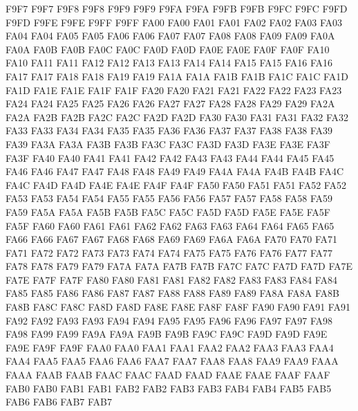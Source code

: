 \ID F9F7 F9F7
\ID F9F8 F9F8
\ID F9F9 F9F9
\ID F9FA F9FA
\ID F9FB F9FB
\ID F9FC F9FC
\ID F9FD F9FD
\ID F9FE F9FE
\ID F9FF F9FF
\ID FA00 FA00
\ID FA01 FA01
\ID FA02 FA02
\ID FA03 FA03
\ID FA04 FA04
\ID FA05 FA05
\ID FA06 FA06
\ID FA07 FA07
\ID FA08 FA08
\ID FA09 FA09
\ID FA0A FA0A
\ID FA0B FA0B
\ID FA0C FA0C
\ID FA0D FA0D
\ID FA0E FA0E
\ID FA0F FA0F
\ID FA10 FA10
\ID FA11 FA11
\ID FA12 FA12
\ID FA13 FA13
\ID FA14 FA14
\ID FA15 FA15
\ID FA16 FA16
\ID FA17 FA17
\ID FA18 FA18
\ID FA19 FA19
\ID FA1A FA1A
\ID FA1B FA1B
\ID FA1C FA1C
\ID FA1D FA1D
\ID FA1E FA1E
\ID FA1F FA1F
\ID FA20 FA20
\ID FA21 FA21
\ID FA22 FA22
\ID FA23 FA23
\ID FA24 FA24
\ID FA25 FA25
\ID FA26 FA26
\ID FA27 FA27
\ID FA28 FA28
\ID FA29 FA29
\ID FA2A FA2A
\ID FA2B FA2B
\ID FA2C FA2C
\ID FA2D FA2D
\ID FA30 FA30
\ID FA31 FA31
\ID FA32 FA32
\ID FA33 FA33
\ID FA34 FA34
\ID FA35 FA35
\ID FA36 FA36
\ID FA37 FA37
\ID FA38 FA38
\ID FA39 FA39
\ID FA3A FA3A
\ID FA3B FA3B
\ID FA3C FA3C
\ID FA3D FA3D
\ID FA3E FA3E
\ID FA3F FA3F
\ID FA40 FA40
\ID FA41 FA41
\ID FA42 FA42
\ID FA43 FA43
\ID FA44 FA44
\ID FA45 FA45
\ID FA46 FA46
\ID FA47 FA47
\ID FA48 FA48
\ID FA49 FA49
\ID FA4A FA4A
\ID FA4B FA4B
\ID FA4C FA4C
\ID FA4D FA4D
\ID FA4E FA4E
\ID FA4F FA4F
\ID FA50 FA50
\ID FA51 FA51
\ID FA52 FA52
\ID FA53 FA53
\ID FA54 FA54
\ID FA55 FA55
\ID FA56 FA56
\ID FA57 FA57
\ID FA58 FA58
\ID FA59 FA59
\ID FA5A FA5A
\ID FA5B FA5B
\ID FA5C FA5C
\ID FA5D FA5D
\ID FA5E FA5E
\ID FA5F FA5F
\ID FA60 FA60
\ID FA61 FA61
\ID FA62 FA62
\ID FA63 FA63
\ID FA64 FA64
\ID FA65 FA65
\ID FA66 FA66
\ID FA67 FA67
\ID FA68 FA68
\ID FA69 FA69
\ID FA6A FA6A
\ID FA70 FA70
\ID FA71 FA71
\ID FA72 FA72
\ID FA73 FA73
\ID FA74 FA74
\ID FA75 FA75
\ID FA76 FA76
\ID FA77 FA77
\ID FA78 FA78
\ID FA79 FA79
\ID FA7A FA7A
\ID FA7B FA7B
\ID FA7C FA7C
\ID FA7D FA7D
\ID FA7E FA7E
\ID FA7F FA7F
\ID FA80 FA80
\ID FA81 FA81
\ID FA82 FA82
\ID FA83 FA83
\ID FA84 FA84
\ID FA85 FA85
\ID FA86 FA86
\ID FA87 FA87
\ID FA88 FA88
\ID FA89 FA89
\ID FA8A FA8A
\ID FA8B FA8B
\ID FA8C FA8C
\ID FA8D FA8D
\ID FA8E FA8E
\ID FA8F FA8F
\ID FA90 FA90
\ID FA91 FA91
\ID FA92 FA92
\ID FA93 FA93
\ID FA94 FA94
\ID FA95 FA95
\ID FA96 FA96
\ID FA97 FA97
\ID FA98 FA98
\ID FA99 FA99
\ID FA9A FA9A
\ID FA9B FA9B
\ID FA9C FA9C
\ID FA9D FA9D
\ID FA9E FA9E
\ID FA9F FA9F
\ID FAA0 FAA0
\ID FAA1 FAA1
\ID FAA2 FAA2
\ID FAA3 FAA3
\ID FAA4 FAA4
\ID FAA5 FAA5
\ID FAA6 FAA6
\ID FAA7 FAA7
\ID FAA8 FAA8
\ID FAA9 FAA9
\ID FAAA FAAA
\ID FAAB FAAB
\ID FAAC FAAC
\ID FAAD FAAD
\ID FAAE FAAE
\ID FAAF FAAF
\ID FAB0 FAB0
\ID FAB1 FAB1
\ID FAB2 FAB2
\ID FAB3 FAB3
\ID FAB4 FAB4
\ID FAB5 FAB5
\ID FAB6 FAB6
\ID FAB7 FAB7

